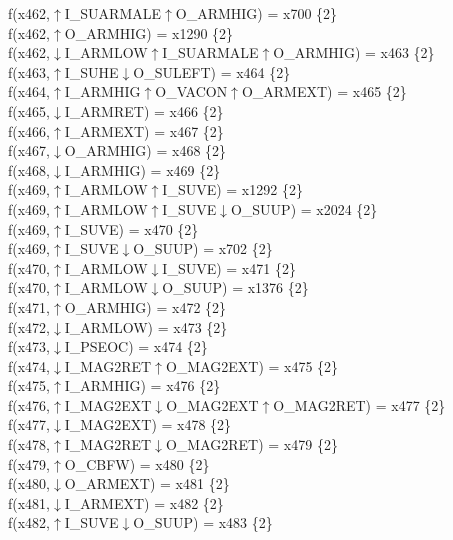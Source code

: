 f(x462,$\uparrow$I\_SUARMALE$\uparrow$O\_ARMHIG) = x700 \{2\} \\  
f(x462,$\uparrow$O\_ARMHIG) = x1290 \{2\} \\  
f(x462,$\downarrow$I\_ARMLOW$\uparrow$I\_SUARMALE$\uparrow$O\_ARMHIG) = x463 \{2\} \\  
f(x463,$\uparrow$I\_SUHE$\downarrow$O\_SULEFT) = x464 \{2\} \\  
f(x464,$\uparrow$I\_ARMHIG$\uparrow$O\_VACON$\uparrow$O\_ARMEXT) = x465 \{2\} \\  
f(x465,$\downarrow$I\_ARMRET) = x466 \{2\} \\  
f(x466,$\uparrow$I\_ARMEXT) = x467 \{2\} \\  
f(x467,$\downarrow$O\_ARMHIG) = x468 \{2\} \\  
f(x468,$\downarrow$I\_ARMHIG) = x469 \{2\} \\  
f(x469,$\uparrow$I\_ARMLOW$\uparrow$I\_SUVE) = x1292 \{2\} \\  
f(x469,$\uparrow$I\_ARMLOW$\uparrow$I\_SUVE$\downarrow$O\_SUUP) = x2024 \{2\} \\  
f(x469,$\uparrow$I\_SUVE) = x470 \{2\} \\  
f(x469,$\uparrow$I\_SUVE$\downarrow$O\_SUUP) = x702 \{2\} \\  
f(x470,$\uparrow$I\_ARMLOW$\downarrow$I\_SUVE) = x471 \{2\} \\  
f(x470,$\uparrow$I\_ARMLOW$\downarrow$O\_SUUP) = x1376 \{2\} \\  
f(x471,$\uparrow$O\_ARMHIG) = x472 \{2\} \\  
f(x472,$\downarrow$I\_ARMLOW) = x473 \{2\} \\  
f(x473,$\downarrow$I\_PSEOC) = x474 \{2\} \\  
f(x474,$\downarrow$I\_MAG2RET$\uparrow$O\_MAG2EXT) = x475 \{2\} \\  
f(x475,$\uparrow$I\_ARMHIG) = x476 \{2\} \\  
f(x476,$\uparrow$I\_MAG2EXT$\downarrow$O\_MAG2EXT$\uparrow$O\_MAG2RET) = x477 \{2\} \\  
f(x477,$\downarrow$I\_MAG2EXT) = x478 \{2\} \\  
f(x478,$\uparrow$I\_MAG2RET$\downarrow$O\_MAG2RET) = x479 \{2\} \\  
f(x479,$\uparrow$O\_CBFW) = x480 \{2\} \\  
f(x480,$\downarrow$O\_ARMEXT) = x481 \{2\} \\  
f(x481,$\downarrow$I\_ARMEXT) = x482 \{2\} \\  
f(x482,$\uparrow$I\_SUVE$\downarrow$O\_SUUP) = x483 \{2\} \\  
